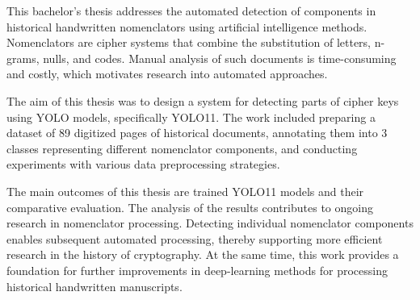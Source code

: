 This bachelor's thesis addresses the automated detection of components in historical handwritten nomenclators using artificial intelligence methods. Nomenclators are cipher systems that combine the substitution of letters, n-grams, nulls, and codes. Manual analysis of such documents is time-consuming and costly, which motivates research into automated approaches.

The aim of this thesis was to design a system for detecting parts of cipher keys using YOLO models, specifically YOLO11. The work included preparing a dataset of 89 digitized pages of historical documents, annotating them into 3 classes representing different nomenclator components, and conducting experiments with various data preprocessing strategies.

The main outcomes of this thesis are trained YOLO11 models and their comparative evaluation. The analysis of the results contributes to ongoing research in nomenclator processing. Detecting individual nomenclator components enables subsequent automated processing, thereby supporting more efficient research in the history of cryptography. At the same time, this work provides a foundation for further improvements in deep-learning methods for processing historical handwritten manuscripts.
